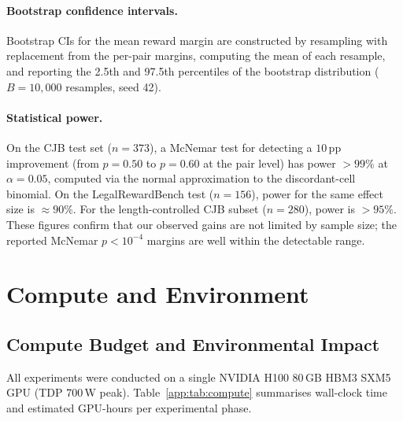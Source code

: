 \documentclass{article}
\theoremstyle{plain}
\theoremstyle{definition}
\theoremstyle{remark}
\begin{document}
\paragraph{Bootstrap confidence intervals.}
Bootstrap CIs for the mean reward margin are constructed by resampling with replacement from the per-pair margins, computing the mean of each resample, and reporting the 2.5th and 97.5th percentiles of the bootstrap distribution ($B = 10{,}000$ resamples, seed 42).

\paragraph{Statistical power.}
On the CJB test set ($n = 373$), a McNemar test for detecting a $10$\,pp improvement (from $p=0.50$ to $p=0.60$ at the pair level) has power $> 99\%$ at $\alpha = 0.05$, computed via the normal approximation to the discordant-cell binomial.  On the LegalRewardBench test ($n = 156$), power for the same effect size is $\approx 90\%$.  For the length-controlled CJB subset ($n = 280$), power is $> 95\%$.  These figures confirm that our observed gains are not limited by sample size; the reported McNemar $p < 10^{-4}$ margins are well within the detectable range.


\section{Compute and Environment}
\label{app:compute-environment}

\subsection{Compute Budget and Environmental Impact}
\label{app:compute}

All experiments were conducted on a single NVIDIA H100 80\,GB HBM3 SXM5 GPU (TDP 700\,W peak).  Table~\ref{app:tab:compute} summarises wall-clock time and estimated GPU-hours per experimental phase.
\end{document}

